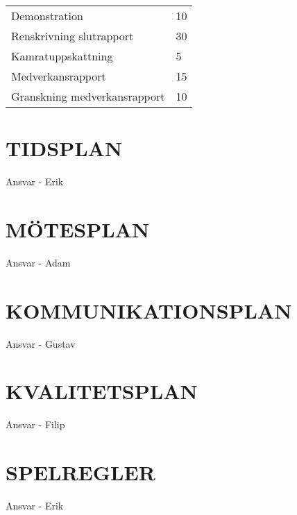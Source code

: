 \documentclass[a4paper]{article}
\begin{document}
\begin{table}[htb]
\begin{tabular}{|l|l|}
Demonstration                                             & 10               \\
Renskrivning slutrapport                                  & 30               \\
Kamratuppskattning                                        & 5                \\
Medverkansrapport                                         & 15               \\
Granskning medverkansrapport                              & 10               \\ \hline
\end{tabular}
\end{table}

\section{TIDSPLAN}
\label{sec:tidsplan}

Ansvar - Erik

\section{MÖTESPLAN}
\label{sec:mötesplan}

Ansvar - Adam

\section{KOMMUNIKATIONSPLAN}
\label{sec:komm}

Ansvar - Gustav

\section{KVALITETSPLAN}
\label{sec:kval}

Ansvar - Filip

\section{SPELREGLER}
\label{sec:spelregler}

Ansvar - Erik

%
%
\end{document}
